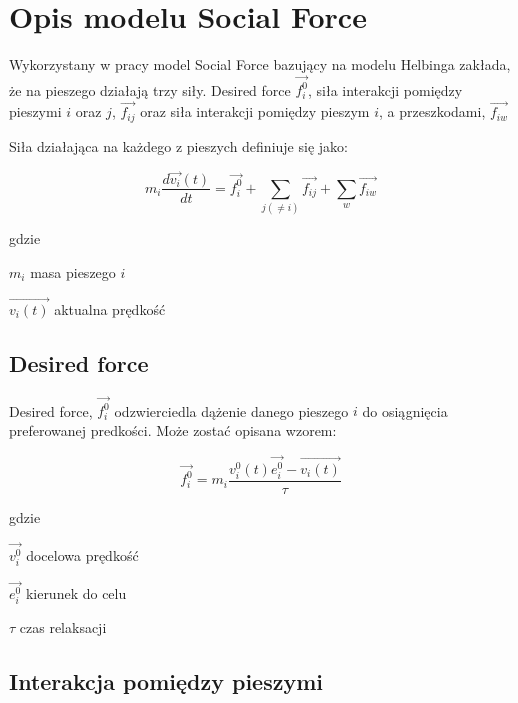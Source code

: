 \chapter{Opis modelu Social Force}
\label{cha:OpisSocialForce}

Wykorzystany w pracy model Social Force \cite{GuideCrowdDynViaModifiedSocialForceModel} bazujący na modelu Helbinga \cite{SforceModelForPedDyn} zakłada, że na pieszego działają trzy siły. Desired force $\vec{f_{i}^{0}}$, siła interakcji pomiędzy pieszymi $i$ oraz $j$, $\vec{f_{ij}}$ oraz siła interakcji pomiędzy pieszym $i$, a przeszkodami, $\vec{f_{iw}}$

Siła działająca na każdego z pieszych definiuje się jako:

\begin{equation}
m_{i} \frac{d\vec{v_{i}}(t)}{dt} = \vec{f_{i}^{0}} + \sum_{j(\neq i)} \vec{f_{ij}} + \sum _{w} \vec{f_{iw}}
\end{equation}

gdzie
\begin{eqwhere}[2cm]
	\item[$m_{i}$] masa pieszego $i$
	\item[$\vec{v_{i}(t)}$] aktualna prędkość
\end{eqwhere}

\section{Desired force}
\label{sec:desiredForce}

Desired force, $\vec{f_{i}^{0}}$ odzwierciedla dążenie danego pieszego $i$ do osiągnięcia preferowanej predkości. Może zostać opisana wzorem:

\begin{equation}
\vec{f_{i}^{0}} = m_{i} \frac{v_{i}^{0}(t) \vec{e_{i}^{0}} - \vec{v_{i}(t)}}{\tau}
\end{equation}

gdzie
\begin{eqwhere}[2cm]
	\item[$\vec{v_{i}^{0}}$] docelowa prędkość
	\item[$\vec{e_{i}^{0}}$] kierunek do celu
	\item[$\tau$] czas relaksacji
\end{eqwhere}
	

\section{Interakcja pomiędzy pieszymi}
\label{sec:interactionBetweenPedestrians}

